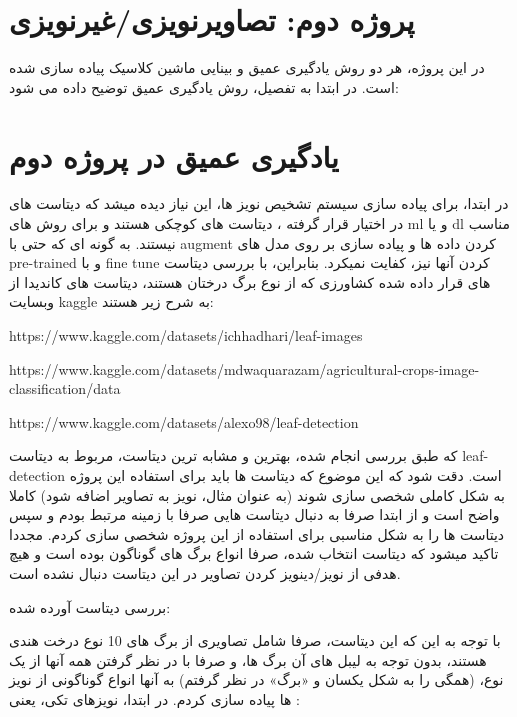 \documentclass[a4paper,12pt]{article}
\begin{document}
\pagebreak
\section{پروژه دوم: تصاویرنویزی/غیرنویزی}
در این پروژه، هر دو روش یادگیری عمیق و بینایی ماشین کلاسیک پیاده سازی شده است. در ابتدا به تفصیل، روش یادگیری عمیق توضیح داده می شود:

\section*{یادگیری عمیق در پروژه دوم}


در ابتدا، برای پیاده سازی سیستم تشخیص نویز ها، این نیاز دیده میشد که دیتاست های در اختیار قرار گرفته ، دیتاست های کوچکی هستند و برای روش های ml و یا dl مناسب نیستند. به گونه ای که حتی با augment کردن داده ها و پیاده سازی بر روی مدل های pre-trained و با fine tune کردن آنها نیز، کفایت نمیکرد.  بنابراین، با بررسی دیتاست های قرار داده شده کشاورزی که از نوع برگ درختان هستند، دیتاست های کاندیدا از وبسایت kaggle به شرح زیر هستند:
\begin{enumerate}
\end{enumerate}

که طبق بررسی انجام شده، بهترین و مشابه ترین دیتاست، مربوط به دیتاست leaf-detection است. 
دقت شود که این موضوع که دیتاست ها باید برای استفاده این پروژه به شکل کاملی شخصی سازی شوند (به عنوان مثال، نویز به تصاویر اضافه شود) کاملا واضح است و از ابتدا صرفا به دنبال دیتاست هایی صرفا با زمینه مرتبط بودم و سپس دیتاست ها را به شکل مناسبی برای استفاده از این پروژه شخصی سازی کردم. مجددا تاکید میشود که دیتاست انتخاب شده، صرفا انواع برگ های گوناگون بوده است و هیچ هدفی از نویز/دینویز کردن تصاویر در این دیتاست دنبال نشده است. 

بررسی دیتاست آورده شده:

با توجه به این که این دیتاست، صرفا شامل تصاویری از برگ های 10 نوع درخت هندی هستند، بدون توجه به لیبل های آن برگ ها، و صرفا با در نظر گرفتن همه آنها از یک نوع، (همگی را به شکل یکسان و «برگ» در نظر گرفتم) به آنها انواع گوناگونی از نویز ها پیاده سازی کردم. در ابتدا، نویزهای تکی، یعنی :
\end{document}

